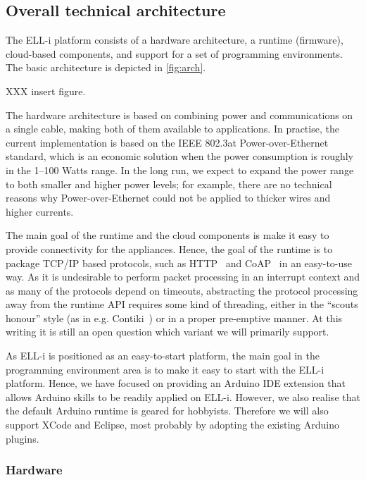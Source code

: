\documentclass[draft,a4paper]{siamltex}
\begin{document}
\subsection{Overall technical architecture}

The ELL-i platform consists of a hardware architecture, a runtime
(firmware), cloud-based components, and support for a set of
programming environments.  The basic architecture is depicted in
\ref{fig:arch}.

XXX insert figure.

The hardware architecture is based on combining power and
communications on a single cable, making both of them available to
applications.  In practise, the current implementation is based on the
IEEE 802.3at Power-over-Ethernet standard, which is an economic
solution when the power consumption is roughly in the 1--100 Watts
range.  In the long run, we expect to expand the power range to both
smaller and higher power levels; for example, there are no technical
reasons why Power-over-Ethernet could not be applied to thicker wires
and higher currents.

The main goal of the runtime and the cloud components is make it easy
to provide connectivity for the appliances.  Hence, the goal of the
runtime is to package TCP/IP based protocols, such as HTTP~\cite{HTTP}
and CoAP~\cite{CoAP} in an easy-to-use way.  As it is undesirable to
perform packet processing in an interrupt context and as many of the
protocols depend on timeouts, abstracting the protocol processing away
from the runtime API requires some kind of threading, either in the
``scouts honour'' style (as in e.g. Contiki~\cite{Contiki-scheduler})
or in a proper pre-emptive manner.  At this writing it is still an
open question which variant we will primarily support.

As ELL-i is positioned as an easy-to-start platform, the main goal in
the programming environment area is to make it easy to start with the
ELL-i platform.  Hence, we have focused on providing an Arduino IDE
extension that allows Arduino skills to be readily applied on ELL-i.
However, we also realise that the default Arduino runtime is geared
for hobbyists.  Therefore we will also support XCode and Eclipse, most
probably by adopting the existing Arduino plugins.

\subsubsection{Hardware}
\end{document}
